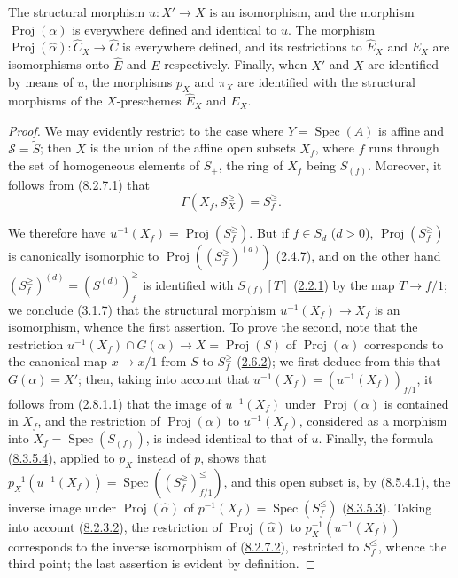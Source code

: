 \begin{proposition}[8.6.2]
\label{II.8.6.2}
The structural morphism $u:X'\to X$ is an \textup{isomorphism}, and the morphism
$\operatorname{Proj}(\alpha)$ is everywhere defined and identical to $u$. The
morphism
$\operatorname{Proj}(\widehat{\alpha}):\widehat{C}_X\to\widehat{C}$ is
everywhere defined, and its restrictions to $\widehat{E}_X$ and $E_X$ are
\textup{isomorphisms} onto $\widehat{E}$ and $E$ respectively. Finally, when $X'$ and
$X$ are identified by means of $u$, the morphisms $p_X$ and $\pi_X$
are identified with the structural morphisms of the $X$-preschemes $\widehat{E}_X$ and
$E_X$.
\end{proposition}

\begin{proof}
We may evidently restrict to the case where $Y=\operatorname{Spec}(A)$ is affine
and $\mathcal{S}=\widetilde{S}$; then $X$ is the union of the affine open subsets
$X_f$, where $f$ runs through the set of homogeneous elements of $S_+$, the ring
of $X_f$ being $S_{(f)}$. Moreover, it follows from
(\hyperref[II.8.2.7.1]{8.2.7.1}) that
\begin{equation}
\label{II.8.6.2.1}
  \Gamma(X_f,\mathcal{S}_X^{\geq})=S_f^{\geq}.
\tag{8.6.2.1}
\end{equation}

We therefore have $u^{-1}(X_f)=\operatorname{Proj}(S_f^{\geq})$. But if
$f\in S_d$ ($d>0$), $\operatorname{Proj}(S_f^{\geq})$ is canonically
isomorphic to $\operatorname{Proj}((S_f^{\geq})^{(d)})$
(\hyperref[II.2.4.7]{2.4.7}), and on the other hand
$(S_f^{\geq})^{(d)}=(S^{(d)})_f^{\geq}$ is identified with $S_{(f)}[T]$
(\hyperref[II.2.2.1]{2.2.1}) by the map $T\to f/1$; we conclude
(\hyperref[II.3.1.7]{3.1.7}) that the structural morphism
$u^{-1}(X_f)\to X_f$ is an isomorphism, whence the first assertion. To
prove the second, note that the restriction
$u^{-1}(X_f)\cap G(\alpha)\to X=\operatorname{Proj}(S)$ of
$\operatorname{Proj}(\alpha)$ corresponds to the canonical map
$x\to x/1$ from $S$ to $S_f^{\geq}$
(\hyperref[II.2.6.2]{2.6.2}); we first deduce from this that
$G(\alpha)=X'$; then, taking into account that
$u^{-1}(X_f)=(u^{-1}(X_f))_{f/1}$, it follows from
(\hyperref[II.2.8.1.1]{2.8.1.1}) that the image of $u^{-1}(X_f)$ under
$\operatorname{Proj}(\alpha)$ is contained in $X_f$, and the restriction of
$\operatorname{Proj}(\alpha)$ to $u^{-1}(X_f)$, considered as a morphism
into $X_f=\operatorname{Spec}(S_{(f)})$, is indeed identical to that of $u$.
Finally, the formula (\hyperref[II.8.3.5.4]{8.3.5.4}), applied to $p_X$
instead of $p$, shows that
$p_X^{-1}(u^{-1}(X_f))=
\operatorname{Spec}((S_f^{\geq})_{f/1}^{\leq})$, and this open subset is, by
(\hyperref[II.8.5.4.1]{8.5.4.1}), the inverse image under
$\operatorname{Proj}(\widehat{\alpha})$ of
$p^{-1}(X_f)=\operatorname{Spec}(S_f^{\leq})$
(\hyperref[II.8.3.5.3]{8.3.5.3}). Taking into account
(\hyperref[II.8.2.3.2]{8.2.3.2}), the restriction of
$\operatorname{Proj}(\widehat{\alpha})$ to
$p_X^{-1}(u^{-1}(X_f))$ corresponds to the inverse isomorphism of
(\hyperref[II.8.2.7.2]{8.2.7.2}), restricted to $S_f^{\leq}$, whence the
third point; the last assertion is evident by definition.


\end{proof}
